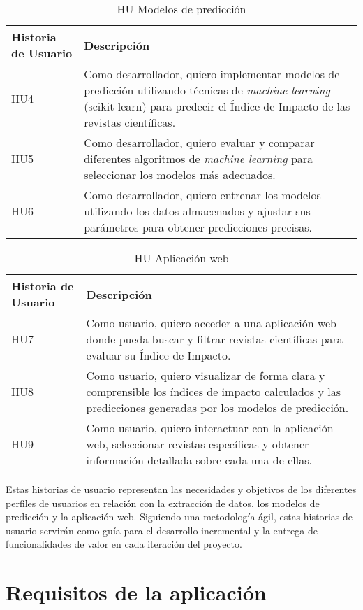 \begin{table}[h]
\centering
\begin{tabular}{|p{3cm}|p{8cm}|}
\hline
\textbf{Historia de Usuario} & \textbf{Descripción} \\
\hline
HU4 & Como desarrollador, quiero implementar modelos de predicción utilizando técnicas de \textit{machine learning} (scikit-learn) para predecir el Índice de Impacto de las revistas científicas. \\
\hline
HU5 & Como desarrollador, quiero evaluar y comparar diferentes algoritmos de \textit{machine learning} para seleccionar los modelos más adecuados. \\
\hline
HU6 & Como desarrollador, quiero entrenar los modelos utilizando los datos almacenados y ajustar sus parámetros para obtener predicciones precisas. \\
\hline
\end{tabular}
\caption{HU Modelos de predicción}
\label{tab:Modelos de predicción}
\end{table}

\begin{table}[h]
\centering
\begin{tabular}{|p{3cm}|p{8cm}|}
\hline
\textbf{Historia de Usuario} & \textbf{Descripción} \\
\hline
HU7 & Como usuario, quiero acceder a una aplicación web donde pueda buscar y filtrar revistas científicas para evaluar su Índice de Impacto. \\
\hline
HU8 & Como usuario, quiero visualizar de forma clara y comprensible los índices de impacto calculados y las predicciones generadas por los modelos de predicción. \\
\hline
HU9 & Como usuario, quiero interactuar con la aplicación web, seleccionar revistas específicas y obtener información detallada sobre cada una de ellas. \\
\hline
\end{tabular}
\caption{HU Aplicación web}
\label{tab:Aplicación web}
\end{table}

Estas historias de usuario representan las necesidades y objetivos de los diferentes perfiles de usuarios en relación con la extracción de datos, los modelos de predicción y la aplicación web. Siguiendo una metodología ágil, estas historias de usuario servirán como guía para el desarrollo incremental y la entrega de funcionalidades de valor en cada iteración del proyecto.

\section{Requisitos de la aplicación}
\label{sec:Requisitos de aplicación}

